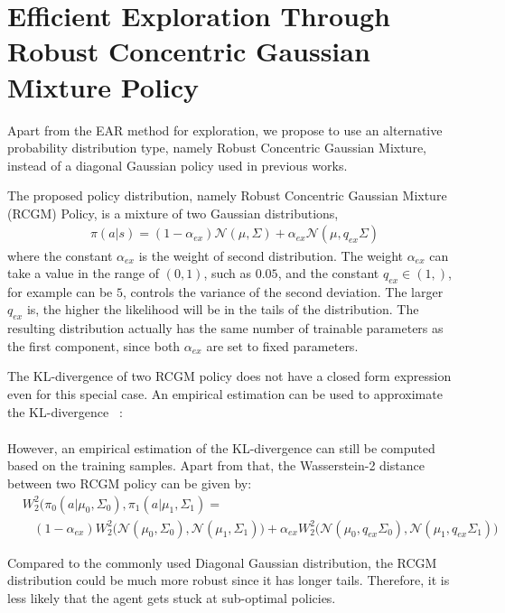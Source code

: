 \section{Efficient Exploration Through Robust Concentric Gaussian Mixture Policy}
Apart from the EAR method for exploration, we propose to use an alternative probability distribution type, namely Robust Concentric Gaussian Mixture, instead of a diagonal Gaussian policy used in previous works.

The proposed policy distribution, namely Robust Concentric Gaussian Mixture (RCGM) Policy, is a mixture of two Gaussian distributions,
\begin{align}
\pi (a|s) = (1-\alpha_{ex})\mathcal{N}(\mu,\Sigma) + \alpha_{ex} \mathcal{N}(\mu,q_{ex}\Sigma)
\end{align}
where the constant $\alpha_{ex}$ is the weight of second distribution. The weight $\alpha_{ex}$ can take a value in the range of $(0,1)$, such as $0.05$, and the constant $q_{ex} \in (1,)$, for example can be $5$, controls the variance of the second deviation. The larger $q_{ex}$ is, the higher the likelihood will be in the tails of the distribution. The resulting distribution actually has the same number of trainable parameters as the first component, since both $\alpha_{ex}$ are set to fixed parameters.

The KL-divergence of two RCGM policy does not have a closed form expression even for this special case. An empirical estimation can be used to approximate the KL-divergence ~\cite{hershey2007approximat}:%
\begin{align}

\end{align}

However, an empirical estimation of the KL-divergence can still be computed based on the training samples. Apart from that, the Wasserstein-2 distance between two RCGM policy can be given by:
\begin{align}&W_2^2(\pi_{0}(a|\mu_0,\Sigma_0), \pi_{1}(a|\mu_1,\Sigma_1) =  \\ \nonumber
& \ \ \ \ (1-\alpha_{ex})
W_2^2\big(\mathcal{N}(\mu_0,\Sigma_0), \mathcal{N}(\mu_1,\Sigma_1)\big)
+ \alpha_{ex} W_2^2\big(\mathcal{N}(\mu_0,q_{ex}\Sigma_0), \mathcal{N}(\mu_1,q_{ex}\Sigma_1)\big)
\end{align}


Compared to the commonly used Diagonal Gaussian distribution, the RCGM distribution could be much more robust since it has longer tails. Therefore, it is less likely that the agent gets stuck at sub-optimal policies.


